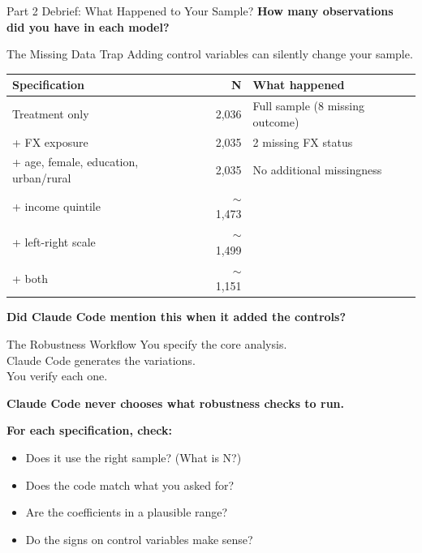 \begin{frame}{Part 2 Debrief: What Happened to Your Sample?}
  \textbf{How many observations did you have in each model?}

  \vspace{1em}
  \pause
  \begin{alertblock}{The Missing Data Trap}
    Adding control variables can silently change your sample.
  \end{alertblock}

  \vspace{0.3em}
  \begin{tabular}{lrl}
    \toprule
    \textbf{Specification} & \textbf{N} & \textbf{What happened} \\
    \midrule
    Treatment only & 2,036 & Full sample (8 missing outcome) \\
    + FX exposure & 2,035 & 2 missing FX status \\
    + age, female, education, urban/rural & 2,035 & No additional missingness \\
    + income quintile & $\sim$1,473 & \color{red!70!black}{565 missing income} \\
    + left-right scale & $\sim$1,499 & \color{red!70!black}{542 missing left-right} \\
    + both & $\sim$1,151 & \color{red!70!black}{44\% of sample dropped} \\
    \bottomrule
  \end{tabular}

  \vspace{0.5em}
  \textbf{Did Claude Code mention this when it added the controls?}
\end{frame}


\begin{frame}{The Robustness Workflow}
  \centering
  {\large You specify the core analysis.\\
  Claude Code generates the variations.\\
  You verify each one.}

  \vspace{1.5em}
  \textbf{Claude Code never chooses what robustness checks to run.}

  \vspace{1em}
  \textbf{For each specification, check:}
  \begin{itemize}
    \item Does it use the right sample? (What is N?)
    \item Does the code match what you asked for?
    \item Are the coefficients in a plausible range?
    \item Do the signs on control variables make sense?
  \end{itemize}

\end{frame}

